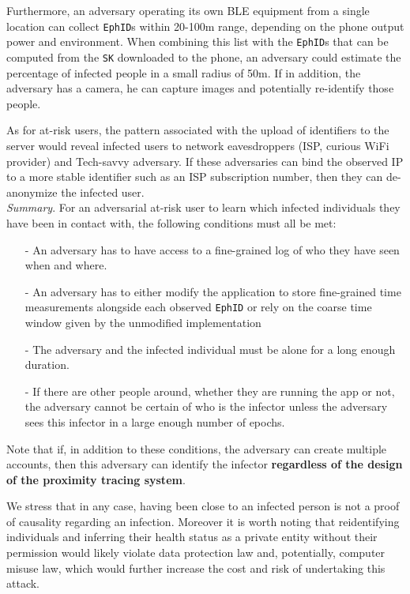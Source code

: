 \documentclass[10.8pt,a4paper]{article}
\begin{document}
Furthermore, an adversary operating its own BLE equipment from a single location can
collect \texttt{EphID}s within 20-100m range, depending on the phone output power and
environment. When combining this list with the \texttt{EphID}s that can be computed from the \texttt{SK} downloaded to the phone, an adversary could estimate the percentage of infected people in a small radius of 50m. If in addition, the adversary has a camera, he can capture images and potentially re-identify those people.

As for at-risk users, the pattern associated with the upload of identifiers to the server would reveal infected users to network eavesdroppers (ISP, curious WiFi provider) and Tech-savvy adversary. If these adversaries can bind the observed IP to a more stable identifier such as an ISP subscription number, then they can de-anonymize the infected user.\\[0.6cm]
\textit{Summary}. For an adversarial at-risk user to learn which infected individuals they have been in contact with, the following conditions must all be met:
\begin{itemize}\itemsep0pt
\item[-] An adversary has to have access to a fine-grained log of who they have seen when
and where.
\item[-] An adversary has to either modify the application to store fine-grained time
measurements alongside each observed \texttt{EphID} or rely on the coarse time window
given by the unmodified implementation 
\item[-] The adversary and the infected individual must be alone for a long enough duration.
\item[-] If there are other people around, whether they are running the app or not, the
adversary cannot be certain of who is the infector unless the adversary sees this
infector in a large enough number of epochs.
\end{itemize}
Note that if, in addition to these conditions, the adversary can create multiple accounts, then this adversary can identify the infector \textbf{regardless of the design of the proximity tracing system}.

We stress that in any case, having been close to an infected person is not a proof of
causality regarding an infection. Moreover it is worth noting that reidentifying individuals and inferring their health status as a private entity without their permission would likely violate data protection law and, potentially, computer misuse law, which would further increase the cost and risk of undertaking this attack.
\end{document}

